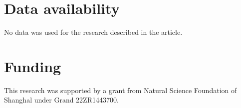 \documentclass[final,3p,times]{elsarticle}
\begin{document}
\section*{Data availability}
No data was used for the research described in the article.
\section*{Funding}
This research was supported by a grant from Natural Science Foundation of Shanghal under Grand 22ZR1443700.




\appendix
\end{document}
